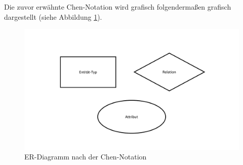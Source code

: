 		Die zuvor erwähnte Chen-Notation wird grafisch folgendermaßen grafisch dargestellt (siehe Abbildung \ref{fig:chennotation}).
					\begin{figure}[H]
						\centering 
						\includegraphics[scale=0.3]{img/ChenNotationERDiagramm.pdf}
						\captionsetup{format=hang}
						\caption[ER-Diagramm Chen-Notation]{\label{fig:chennotation} ER-Diagramm nach der Chen-Notation }
					\end{figure}
		
